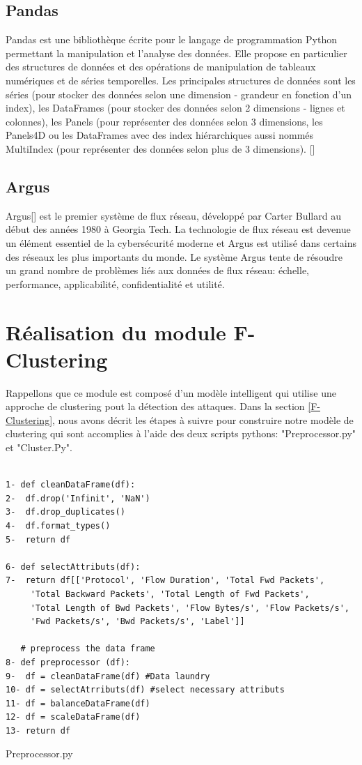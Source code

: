 \subsection{Pandas}
Pandas est une bibliothèque écrite pour le langage de programmation Python permettant la manipulation et l'analyse des données. Elle propose en particulier des structures de données et des opérations de manipulation de tableaux numériques et de séries temporelles. Les principales structures de données sont les séries (pour stocker des données selon une dimension - grandeur en fonction d'un index), les DataFrames (pour stocker des données selon 2 dimensions - lignes et colonnes), les Panels (pour représenter des données selon 3 dimensions, les Panels4D ou les DataFrames avec des index hiérarchiques aussi nommés MultiIndex (pour représenter des données selon plus de 3 dimensions). [\cite{30}]

\subsection{Argus}
Argus[\cite{31}] est le premier système de flux réseau, développé par Carter Bullard au début des années 1980 à Georgia Tech. La technologie de flux réseau est devenue un élément essentiel de la cybersécurité moderne et Argus est utilisé dans certains des réseaux les plus importants du monde. Le système Argus tente de résoudre un grand nombre de problèmes liés aux données de flux réseau: échelle, performance, applicabilité, confidentialité et utilité.\\

\section{Réalisation du module F-Clustering}
Rappellons que ce module est composé d'un modèle intelligent qui utilise une approche de clustering pout la détection des attaques. Dans la section \ref{F-Clustering}, nous avons décrit les étapes à suivre pour construire notre modèle de clustering qui sont accomplies à l'aide des deux scripts pythons: "Preprocessor.py" et "Cluster.Py".
\begin{algorithm}[H]
\begin{verbatim}

1- def cleanDataFrame(df):
2-  df.drop('Infinit', 'NaN')
3-  df.drop_duplicates()
4-  df.format_types()
5-  return df

6- def selectAttributs(df):
7-  return df[['Protocol', 'Flow Duration', 'Total Fwd Packets',
     'Total Backward Packets', 'Total Length of Fwd Packets',	
     'Total Length of Bwd Packets', 'Flow Bytes/s', 'Flow Packets/s', 
     'Fwd Packets/s', 'Bwd Packets/s', 'Label']]
	
   # preprocess the data frame
8- def preprocessor (df): 
9-  df = cleanDataFrame(df) #Data laundry
10- df = selectAtrributs(df) #select necessary attributs 
11- df = balanceDataFrame(df) 
12- df = scaleDataFrame(df)
13- return df

\end{verbatim}
\caption{Preprocessor.py}
\end{algorithm}

